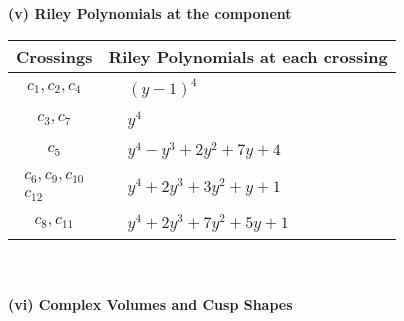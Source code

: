 \documentclass[1p]{elsarticle_modified}
\theoremstyle{definition}
\begin{document}
\newpage\renewcommand{\arraystretch}{1}
\flushleft \textbf{(v) Riley Polynomials at the component}\newline \\
\begin{tabular}{m{50pt}|m{274pt}}
Crossings & \hspace{64pt}Riley Polynomials at each crossing \\
\hline $$\begin{aligned}c_{1},c_{2},c_{4}\end{aligned}$$&$\begin{aligned}
&(y-1)^4
\end{aligned}$\\
\hline $$\begin{aligned}c_{3},c_{7}\end{aligned}$$&$\begin{aligned}
&y^4
\end{aligned}$\\
\hline $$\begin{aligned}c_{5}\end{aligned}$$&$\begin{aligned}
&y^4- y^3+2 y^2+7 y+4
\end{aligned}$\\
\hline $$\begin{aligned}c_{6},c_{9},c_{10}\\c_{12}\end{aligned}$$&$\begin{aligned}
&y^4+2 y^3+3 y^2+y+1
\end{aligned}$\\
\hline $$\begin{aligned}c_{8},c_{11}\end{aligned}$$&$\begin{aligned}
&y^4+2 y^3+7 y^2+5 y+1
\end{aligned}$\\
\hline
\end{tabular}\\~\\
\newpage\flushleft \textbf{(vi) Complex Volumes and Cusp Shapes}
\end{document}
